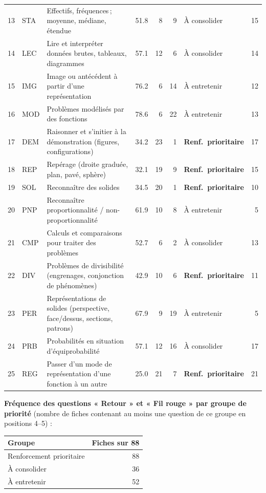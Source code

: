 {\begin{tabular}{@{}l l p{7.1cm} r r r l r@{}}
13 & STA & Effectifs, fréquences\,; moyenne, médiane, étendue & \num{51,8} & 8 & 9 & À consolider & 15 \\
14 & LEC & Lire et interpréter données brutes, tableaux, diagrammes & \num{57,1} & 12 & 6 & À consolider & 14 \\
15 & IMG & Image ou antécédent à partir d'une représentation & \num{76,2} & 6 & 14 & À entretenir & 12 \\
16 & MOD & Problèmes modélisés par des fonctions & \num{78,6} & 6 & 22 & À entretenir & 13 \\
17 & DEM & Raisonner et s'initier à la démonstration (figures, configurations) & \num{34,2} & 23 & 1 & \textbf{Renf.\ prioritaire} & 17 \\
18 & REP & Repérage (droite graduée, plan, pavé, sphère) & \num{32,1} & 19 & 9 & \textbf{Renf.\ prioritaire} & 15 \\
19 & SOL & Reconnaître des solides & \num{34,5} & 20 & 1 & \textbf{Renf.\ prioritaire} & 10 \\
20 & PNP & Reconnaître proportionnalité / non-proportionnalité & \num{61,9} & 10 & 8 & À entretenir & 5 \\
21 & CMP & Calculs et comparaisons pour traiter des problèmes & \num{52,7} & 6 & 2 & À consolider & 13 \\
22 & DIV & Problèmes de divisibilité (engrenages, conjonction de phénomènes) & \num{42,9} & 10 & 6 & \textbf{Renf.\ prioritaire} & 11 \\
23 & PER & Représentations de solides (perspective, face/dessus, sections, patrons) & \num{67,9} & 9 & 19 & À entretenir & 5 \\
24 & PRB & Probabilités en situation d'équiprobabilité & \num{57,1} & 12 & 16 & À consolider & 17 \\
25 & REG & Passer d'un mode de représentation d'une fonction à un autre & \num{25,0} & 21 & 7 & \textbf{Renf.\ prioritaire} & 21 \\
\bottomrule\end{tabular}}\par\bigskip
\textbf{Fréquence des questions « Retour » et « Fil rouge » par groupe de priorité} (nombre de fiches contenant au moins une question de ce groupe en positions 4–5) :\par\smallskip
\begin{tabular}{@{}l r@{}}\toprule Groupe & Fiches sur 88 \\ \midrule
Renforcement prioritaire & 88 \\
À consolider & 36 \\
À entretenir & 52 \\
\bottomrule\end{tabular}\par